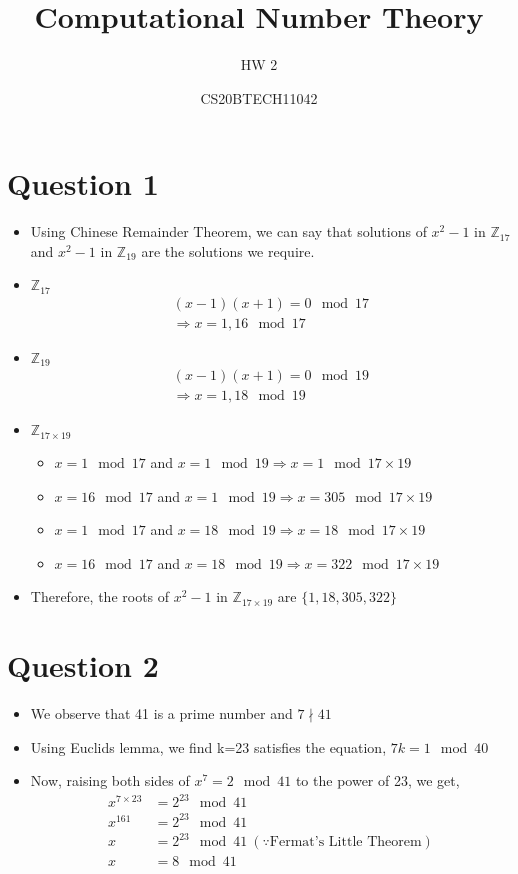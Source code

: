\documentclass{article}
\title{Computational Number Theory}
\author{HW 2}
\date{CS20BTECH11042}
\theoremstyle{mytheoremstyle}
\theoremstyle{mytheoremstyle}
\theoremstyle{myproblemstyle}
\begin{document}
    \maketitle
    
\section{Question 1}
\begin{itemize}
    \item Using Chinese Remainder Theorem, we can say that solutions of $x^2 -1$ in $\mathbb{Z}_{17}$ and $x^2 -1$ in $\mathbb{Z}_{19}$ are the solutions we require.
    \item  $\mathbb{Z}_{17}$
    \begin{align*}
        (x-1)(x+1) = 0 \mod 17 \\
        \Rightarrow x = 1, 16 \mod 17
    \end{align*}
    \item  $\mathbb{Z}_{19}$
    \begin{align*}
        (x-1)(x+1) = 0 \mod 19 \\
        \Rightarrow x = 1, 18 \mod 19
    \end{align*}
    \item  $\mathbb{Z}_{17 \times 19}$
    \begin{itemize}
        \item $x = 1 \mod 17$ and $x = 1 \mod 19 \Rightarrow x = 1 \mod {17 \times 19}$
        \item $x = 16 \mod 17$ and $x = 1 \mod 19 \Rightarrow x = 305 \mod {17 \times 19}$
        \item $x = 1 \mod 17$ and $x = 18 \mod 19 \Rightarrow x = 18 \mod {17 \times 19}$
        \item $x = 16 \mod 17$ and $x = 18 \mod 19 \Rightarrow x = 322 \mod {17 \times 19}$
    \end{itemize}
    \item Therefore, the roots of $x^2 -1$ in $\mathbb{Z}_{17 \times 19}$ are $\{1, 18, 305, 322\}$
\end{itemize}


\section{Question 2}
    \begin{itemize}
        \item We observe that 41 is a prime number and $7 \nmid 41$
        \item Using Euclids lemma, we find k=23 satisfies the equation, $7k = 1 \mod 40$
        \item Now, raising both sides of $x^7 = 2 \mod 41$ to the power of 23, we get,
        \begin{align*}
            x^{7 \times 23} &= 2^{23} \mod 41 \\
            x^{161} &= 2^{23} \mod 41 \\
            x &= 2^{23} \mod 41 \ (\because \text{Fermat's Little Theorem})\\
            x &= 8 \mod 41 
        \end{align*}
    \end{itemize}
\end{document}
